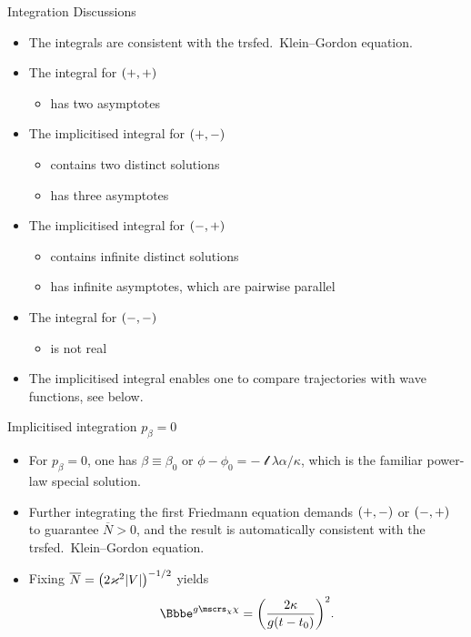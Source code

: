 \documentclass[9pt]{beamer}
\begin{document}
\begin{frame}%
{Integration}%
{Discussions}
\begin{itemize}
\item The integrals are consistent with the trsfed.\ Klein--Gordon equation.
\item The integral for ${\left(+,+\right)}$
\begin{itemize}
	\item has two asymptotes
\end{itemize}
\item The implicitised integral for ${\left(+,-\right)}$ 
\begin{itemize}
	\item contains two distinct solutions
	\item has three asymptotes
\end{itemize}
\item The implicitised integral for ${\left(-,+\right)}$
\begin{itemize}
	\item contains infinite distinct solutions
	\item has infinite asymptotes, which are pairwise parallel
\end{itemize}
\item The integral for ${\left(-,-\right)}$
\begin{itemize}
	\item is not real
\end{itemize}
\item The implicitised integral enables one to compare trajectories with wave 
functions, see below.
\end{itemize}
\end{frame}

\begin{frame}%
{Implicitised integration}%
{$p_\beta = 0$}
\begin{itemize}
\item For $p_\beta = 0$, one has $\beta \equiv \beta_0$ or $\phi-\phi_0 =
-\mscrl\lambda\alpha/\kappa$, which is the familiar power-law special
solution.

\item Further integrating the first Friedmann equation demands ${\left(+,-\right)}$
or ${\left(-,+\right)}$ to guarantee $\overline{N} > 0$, and the result is
automatically consistent with the trsfed.\ Klein--Gordon equation.

\item Fixing $\overline{N} = {\left(2\varkappa^2{\left|V\right|}\right)}^{-1/2}$ yields
\begin{align}
\ee^{g\mscrs_\chi\chi} = \rbr{\frac{2\kappa}{g\rbr{t-t_0}}}^2.
\end{align}
\end{itemize}
\end{frame}
\end{document}
